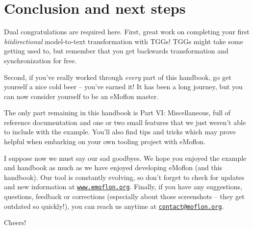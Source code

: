 \newpage
\section{Conclusion and next steps}
\genHeader

Dual congratulations are required here. First, great work on completing your first \emph{biidirectional} model-to-text transformation with TGGs! TGGs
might take some getting used to, but remember that you get backwards transformation and synchronization for free.

Second, if you've really worked through \emph{every} part of this handbook, go get yourself a nice cold beer -- you've earned it! It
has been a long journey, but you can now consider yourself to be an eMoflon master.

The only part remaining in this handbook is Part VI: Miscellaneous, full of reference documentation and one or two small features that we just weren't able to
include with the example. You'll also find tips and tricks which may prove helpful when embarking on your own tooling project with eMoflon.

I suppose now we must say our sad goodbyes. We hope you enjoyed the example and handbook as much as we have enjoyed developing eMoflon (and this handbook). Our
tool is constantly evolving, so don't forget to check for updates and new information at \texttt{\url{www.emoflon.org}}. Finally, if you have any suggestions,
questions, feedback or corrections (especially about those screenshots -- they get outdated so quickly!), you can reach us anytime at
\texttt{\href{mailto:contact@moflon.org}{contact@moflon.org}}.

Cheers!
